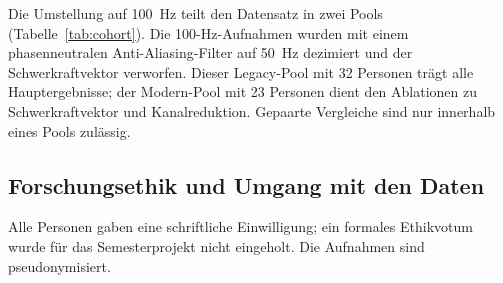 Die Umstellung auf 100~Hz teilt den Datensatz in zwei Pools
(Tabelle~\ref{tab:cohort}). Die 100-Hz-Aufnahmen wurden mit einem
phasenneutralen Anti-Aliasing-Filter auf 50~Hz dezimiert und der
Schwerkraftvektor verworfen. Dieser Legacy-Pool mit 32 Personen trägt alle
Hauptergebnisse; der Modern-Pool mit 23 Personen dient den Ablationen zu
Schwerkraftvektor und Kanalreduktion. Gepaarte Vergleiche sind nur innerhalb
eines Pools zulässig.

\subsection{Forschungsethik und Umgang mit den Daten}
\label{sec:ethics}

Alle Personen gaben eine schriftliche Einwilligung; ein formales Ethikvotum
wurde für das Semesterprojekt nicht eingeholt. Die Aufnahmen sind
pseudonymisiert. 